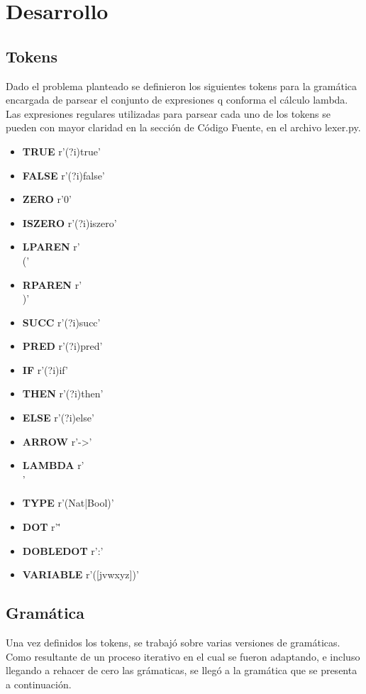 \section{Desarrollo}

\subsection{Tokens}
Dado el problema planteado se definieron los siguientes tokens para la gramática encargada de parsear el conjunto de 
expresiones q conforma el cálculo lambda. Las expresiones regulares utilizadas para parsear cada uno de los tokens se 
pueden con mayor claridad en la sección de Código Fuente, en el archivo lexer.py.

\begin{itemize}
\item \textbf{TRUE} r'(?i)true'
\item \textbf{FALSE} r'(?i)false'
\item \textbf{ZERO} r'0'
\item \textbf{ISZERO} r'(?i)iszero' 
\item \textbf{LPAREN} r'\\('
\item \textbf{RPAREN} r'\\)'
\item \textbf{SUCC} r'(?i)succ' 
\item \textbf{PRED} r'(?i)pred'
\item \textbf{IF} r'(?i)if'
\item \textbf{THEN} r'(?i)then'
\item \textbf{ELSE} r'(?i)else'
\item \textbf{ARROW} r'->'
\item \textbf{LAMBDA} r'\\'
\item \textbf{TYPE} r'(Nat|Bool)'
\item \textbf{DOT} r'\.'
\item \textbf{DOBLEDOT} r':'
\item \textbf{VARIABLE} r'([jvwxyz])'
\end{itemize}

\subsection{Gramática}
Una vez definidos los tokens, se trabajó sobre varias versiones de gramáticas. Como resultante de un proceso 
iterativo en el cual se fueron adaptando, e incluso llegando a rehacer de cero las grámaticas, se llegó a la 
gramática que se presenta a continuación. 

